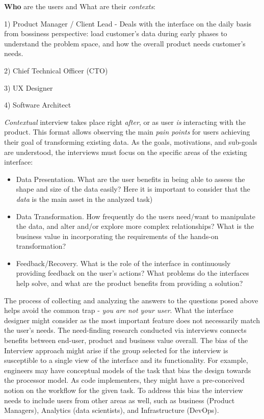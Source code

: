 \documentclass[12pt,letterpaper]{article}
\begin{document}
\textbf{Who} are the users and What are their \textit{contexts}:

1) Product Manager / Client Lead - Deals with the interface on the daily basis from bossiness perspective: load customer's data during early phases to understand the problem space, and how the overall product needs customer's needs.

2) Chief Technical Officer (CTO)

3) UX Designer 

4) Software Architect

\textit{Contextual} interview takes place right \textit{after}, or as user \textit{is} interacting with the product. This format allows observing the main \textit{pain points} for users achieving their goal of transforming existing data. As the goals, motivations, and sub-goals are understood, the interviews must focus on the specific areas of the existing interface:

\begin{itemize}
    \item Data Presentation. What are the user benefits in being able to assess the shape and size of the data easily? Here it is important to consider that the \textit{data} is the main asset in the analyzed task)  
    \item Data Transformation. How frequently do the users need/want to manipulate the data, and alter and/or explore more complex relationships? What is the business value in incorporating the requirements of the hands-on transformation?
    \item Feedback/Recovery. What is the role of the interface in continuously providing feedback on the user's actions? What problems do the interfaces help solve, and what are the product benefits from providing a solution?
\end{itemize}

The process of collecting and analyzing the answers to the questions posed above helps avoid the common trap - \textit{you are not your user}. What the interface designer might consider as the most important feature does not necessarily match the user's needs. The need-finding research conducted via interviews connects benefits between end-user, product and business value overall. The bias of the Interview approach might arise if the group selected for the interview is susceptible to a single view of the interface and its functionality. For example, engineers may have conceptual models of the task that bias the design towards the processor model. As code implementers, they might have a pre-conceived notion on the workflow for the given task. To address this bias the interview needs to include users from other areas as well, such as business (Product Managers), Analytics (data scientists), and Infrastructure (DevOps). 
\end{document}
